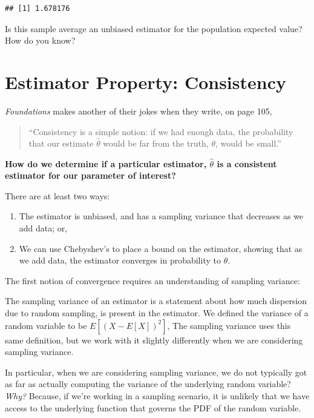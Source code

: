 \documentclass[
]{book}
\providecommand{\tightlist}{%
  \setlength{\itemsep}{0pt}\setlength{\parskip}{0pt}}
\theoremstyle{definition}
\theoremstyle{definition}
\theoremstyle{definition}
\theoremstyle{definition}
\theoremstyle{remark}
\begin{document}
\begin{verbatim}
## [1] 1.678176
\end{verbatim}

Is this sample average an unbiased estimator for the population expected value? How do you know?

\hypertarget{estimator-property-consistency}{%
\section{Estimator Property: Consistency}\label{estimator-property-consistency}}

\emph{Foundations} makes another of their jokes when they write, on page 105,

\begin{quote}
``Consistency is a simple notion: if we had enough data, the probability that our estimate \(\hat{\theta}\) would be far from the truth, \(\theta\), would be small.''
\end{quote}

\textbf{How do we determine if a particular estimator, \(\hat{\theta}\) is a consistent estimator for our parameter of interest?}

There are at least two ways:

\begin{enumerate}
\def\labelenumi{\arabic{enumi}.}
\tightlist
\item
  The estimator is unbiased, and has a sampling variance that decreases as we add data; or,
\item
  We can use Chebyshev's to place a bound on the estimator, showing that as we add data, the estimator converges in probability to \(\theta\).
\end{enumerate}

The first notion of convergence requires an understanding of sampling variance:

The sampling variance of an estimator is a statement about how much dispersion due to random sampling, is present in the estimator. We defined the variance of a random variable to be \(E\left[(X - E[X])^{2}\right]\), The sampling variance uses this same definition, but we work with it slightly differently when we are considering sampling variance.

In particular, when we are considering sampling variance, we do not typically got as far as actually computing the variance of the underlying random variable? \emph{Why?} Because, if we're working in a sampling scenario, it is unlikely that we have access to the underlying function that governs the PDF of the random variable.
\end{document}
